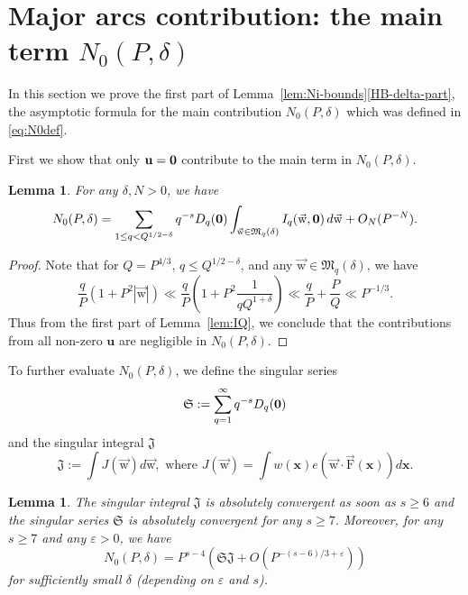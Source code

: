 \documentclass[letterpaper,11pt]{amsart}
\numberwithin{equation}{section}
\newtheorem{lemma}[theorem]{Lemma}
\theoremstyle{definition}
\numberwithin{equation}{section}
\newcommand{\x}{\mathbf{x}}
\newcommand{\uu}{\mathbf{u}}
\newcommand{\uw}{{\vec{\mathrm{w}}}}
\newcommand{\uF}{{\vec{\mathrm{F}} }}
\def\vecnull{{\text{\boldmath$0$}}}
\newcommand{\ve}{\varepsilon}
\begin{document}
\section{Major arcs contribution: the main term \texorpdfstring{$N_0(P, \delta)$}{N0(P, δ)}}\label{sec:major arc}
In this section we prove the first part of Lemma~\ref{lem:Ni-bounds}\eqref{HB-delta-part}, the asymptotic formula for the main contribution $N_0(P, \delta)$ which was defined in \eqref{eq:N0def}. 

First we show that only $\uu=\vecnull$ contribute to the main term in $N_0(P, \delta)$.
\begin{lemma}\label{lem:major1}
	For any $\delta, N>0$, we have
\[N_0(P, \delta)=\sum_{1\leq q< Q^{1/2-\delta}}q^{-s}
			D_q(\vecnull)			
			\int_{\uw\in \mathfrak M_q(\delta) } I_q(\uw,\vecnull)
			\,d\uw+O_{N}(P^{-N}).\]
\end{lemma}
\begin{proof}
Note that for $Q=P^{4/3}$, $q\leq Q^{1/2-\delta}$, and any $\uw\in \mathfrak M_q(\delta)$, we have \[\frac{q}{P}(1+P^2|\uw|)\ll \frac{q}{P}(1+P^2\frac{1}{qQ^{1+\delta}})\ll \frac{q}{P}+\frac{P}{Q}\ll P^{-1/3}.\]
Thus from the first part of Lemma~\ref{lem:IQ}, we conclude that the contributions from all non-zero $\uu$ are negligible in $N_0(P, \delta)$. \end{proof}
To further evaluate $N_0(P, \delta)$, we define the singular series
\begin{equation}\label{eq:SS}
\mathfrak{S}:=\sum_{q=1}^\infty q^{-s}D_q(\vecnull)
\end{equation}
and the singular integral $\mathfrak{J}$ 
\begin{equation}\label{eq:SI}
\mathfrak{J}:=\int J(\uw)d\uw, 	\text{ where } J(\uw)=\int w(\x)e(\uw\cdot \uF(\x))d\x.
\end{equation}
\begin{lemma}\label{N_0asymp}
The singular integral $\mathfrak{J}$ is absolutely convergent as soon as $s\geq 6$ and the singular series $\mathfrak{S}$ is absolutely convergent for any $s\geq 7$. Moreover, for any $s\geq 7$ and any $\ve>0$, we have
\begin{equation}\label{eq:2222}
N_0(P, \delta)=P^{s-4}\left(\mathfrak{SJ}+O(P^{-(s-6)/3+\ve})\right)
\end{equation}
for sufficiently small \(\delta\) (depending on $\varepsilon$ and $s$).
\end{lemma}
\end{document}
